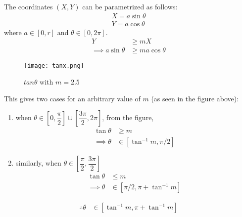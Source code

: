 \documentclass[journal,12pt,twocolumn]{IEEEtran}
\theoremstyle{remark}
\numberwithin{equation}{subsection}
\begin{document}
The coordinates $(X,Y)$ can be parametrized as follows:
\begin{align}
    X = a\sin\theta\\
    Y = a\cos\theta
\end{align} 
where $a \in [0,r]$ and $\theta \in [0, 2\pi]$. 
\begin{align}
    Y &\geq mX\\
    \implies a\sin\theta &\geq ma\cos\theta
\end{align}

\begin{figure}[h]
    \centering
    \texttt{[image: tanx.png]}
    \caption{$tan\theta$ with $m=2.5$}
    \label{fig:my_label}
\end{figure}

This gives two cases for an arbitrary value of $m$ (as seen in the figure above):
\begin{enumerate}
    \item when $\theta\in \left[0,\dfrac{\pi}{2}\right]\cup\left[\dfrac{3\pi}{2},2\pi\right]$, from the figure,
    \begin{align}
        \tan\theta&\geq m\\
        \implies \theta &\in [\tan^{-1}m, \pi/2]
    \end{align}
    \item similarly, when $\theta \in \left[\dfrac{\pi}{2}, \dfrac{3\pi}{2}\right]$
    \begin{align}
        \tan\theta&\leq m\\
        \implies \theta &\in [\pi/2, \pi+\tan^{-1}m]
    \end{align}
\end{enumerate}
\begin{align}
    \therefore \theta &\in [\tan^{-1} m, \pi+\tan^{-1} m]
\end{align}
\end{document}
